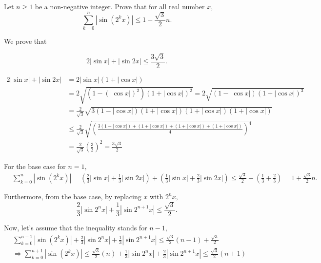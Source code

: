 \documentclass{article}
\begin{document}
\begin{problem}
    Let $n \ge 1$ be a non-negative integer. Prove that for all real number $x$,
    \[
        \sum_{k=0}^{n} | \sin{(2^k x)} | \le 1 + \frac{\sqrt{3}}{2} n.
    \]
\end{problem}

\begin{soln}
    We prove that
    \begin{claim*}
        \[ 
            2|\sin{x}| + |\sin{2x}| \le \frac{3\sqrt{3}}{2}.
        \]
    \end{claim*}
    \begin{subproof}
        \[
            \begin{aligned}
                2|\sin{x}| + |\sin{2x}| 
                &= 2|\sin{x}|(1+|\cos{x}|)\\
                &= 2\sqrt{\left(1-(|\cos{x}|)^2\right)\left(1+|\cos{x}| \right)^2}
                = 2\sqrt{\left(1-|\cos{x}|\right)\left(1+|\cos{x}| \right)^3}\\
                & = \frac{2}{\sqrt{3}} \sqrt{3(1-|\cos{x}|)(1+|\cos{x}|)(1+|\cos{x}|)(1+|\cos{x}|)}\\
                &\le \frac{2}{\sqrt{3}} \sqrt{\left( \frac{3(1-|\cos{x}|)+ (1+|\cos{x}|) + (1+|\cos{x}|) + (1+|\cos{x}|)}{4} \right)^4}\\
                &= \frac{2}{\sqrt{3}} \left(\frac{3}{2}\right)^2 = \frac{3\sqrt{3}}{2}
            \end{aligned}
        \]
    \end{subproof}

    For the base case for $n=1,$
    \[
        \begin{aligned}
            &\sum_{k=0}^{n} | \sin{(2^k x)} | = \left(\frac{2}{3}|\sin{x}| + \frac{1}{3}|\sin{2x}|\right) +  \left(\frac{1}{3}|\sin{x}| + \frac{2}{3}|\sin{2x}|\right)
            \le \frac{\sqrt{3}}{2} + \left(\frac{1}{3} + \frac{2}{3}\right) = 1 + \frac{\sqrt{3}}{2} n.
        \end{aligned}
    \]

    Furthermore, from the base case, by replacing $x$ with $2^n x,$
    \[
        \frac{2}{3}|\sin{2^n x}| + \frac{1}{3}|\sin{2^{n+1} x}| \le \frac{\sqrt{3}}{2}.
    \]

    Now, let's assume that the inequality stands for $n-1$,
    \[
        \begin{aligned}
            &\sum_{k=0}^{n-1} | \sin{(2^k x)} | + \frac{2}{3}|\sin{2^n x}| + \frac{1}{3}|\sin{2^{n+1} x}| \le \frac{\sqrt{3}}{2}(n-1) + \frac{\sqrt{3}}{2}\\
            &\Rightarrow \sum_{k=0}^{n+1} | \sin{(2^k x)} | \le \frac{\sqrt{3}}{2}(n) + \frac{1}{3}|\sin{2^n x}| + \frac{2}{3}|\sin{2^{n+1} x}| \le \frac{\sqrt{3}}{2}(n+1) 
        \end{aligned}
    \]
\end{soln}
\end{document}
